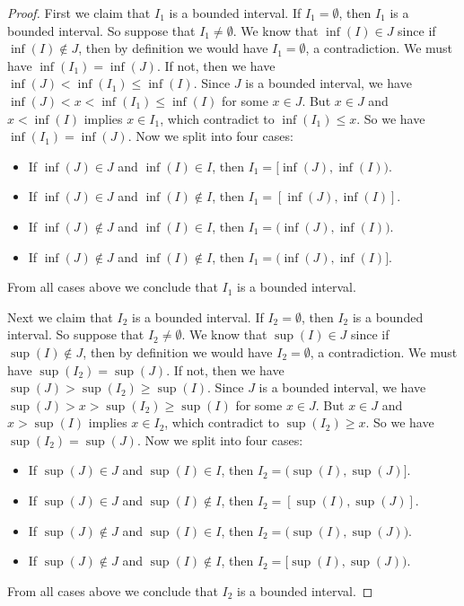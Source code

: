 \begin{proof}
    First we claim that \(I_1\) is a bounded interval.
    If \(I_1 = \emptyset\), then \(I_1\) is a bounded interval.
    So suppose that \(I_1 \neq \emptyset\).
    We know that \(\inf(I) \in J\) since if \(\inf(I) \notin J\), then by definition we would have \(I_1 = \emptyset\), a contradiction.
    We must have \(\inf(I_1) = \inf(J)\).
    If not, then we have \(\inf(J) < \inf(I_1) \leq \inf(I)\).
    Since \(J\) is a bounded interval, we have \(\inf(J) < x < \inf(I_1) \leq \inf(I)\) for some \(x \in J\).
    But \(x \in J\) and \(x < \inf(I)\) implies \(x \in I_1\), which contradict to \(\inf(I_1) \leq x\).
    So we have \(\inf(I_1) = \inf(J)\).
    Now we split into four cases:
    \begin{itemize}
        \item If \(\inf(J) \in J\) and \(\inf(I) \in I\), then \(I_1 = [\inf(J), \inf(I)\big)\).
        \item If \(\inf(J) \in J\) and \(\inf(I) \notin I\), then \(I_1 = [\inf(J), \inf(I)]\).
        \item If \(\inf(J) \notin J\) and \(\inf(I) \in I\), then \(I_1 = \big(\inf(J), \inf(I)\big)\).
        \item If \(\inf(J) \notin J\) and \(\inf(I) \notin I\), then \(I_1 = \big(\inf(J), \inf(I)]\).
    \end{itemize}
    From all cases above we conclude that \(I_1\) is a bounded interval.

    Next we claim that \(I_2\) is a bounded interval.
    If \(I_2 = \emptyset\), then \(I_2\) is a bounded interval.
    So suppose that \(I_2 \neq \emptyset\).
    We know that \(\sup(I) \in J\) since if \(\sup(I) \notin J\), then by definition we would have \(I_2 = \emptyset\), a contradiction.
    We must have \(\sup(I_2) = \sup(J)\).
    If not, then we have \(\sup(J) > \sup(I_2) \geq \sup(I)\).
    Since \(J\) is a bounded interval, we have \(\sup(J) > x > \sup(I_2) \geq \sup(I)\) for some \(x \in J\).
    But \(x \in J\) and \(x > \sup(I)\) implies \(x \in I_2\), which contradict to \(\sup(I_2) \geq x\).
    So we have \(\sup(I_2) = \sup(J)\).
    Now we split into four cases:
    \begin{itemize}
        \item If \(\sup(J) \in J\) and \(\sup(I) \in I\), then \(I_2 = \big(\sup(I), \sup(J)]\).
        \item If \(\sup(J) \in J\) and \(\sup(I) \notin I\), then \(I_2 = [\sup(I), \sup(J)]\).
        \item If \(\sup(J) \notin J\) and \(\sup(I) \in I\), then \(I_2 = \big(\sup(I), \sup(J)\big)\).
        \item If \(\sup(J) \notin J\) and \(\sup(I) \notin I\), then \(I_2 = [\sup(I), \sup(J)\big)\).
    \end{itemize}
    From all cases above we conclude that \(I_2\) is a bounded interval.


\end{proof}
